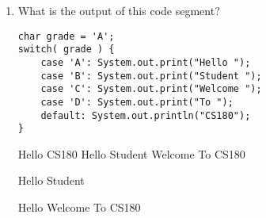 \documentclass[addpoints]{exam}
\begin{document}
\begin{enumerate}
\item {}
What is the output of this code segment?
\begin{lstlisting}
char grade = 'A';
switch( grade ) {
    case 'A': System.out.print("Hello ");
    case 'B': System.out.print("Student ");
    case 'C': System.out.print("Welcome ");
    case 'D': System.out.print("To ");
    default: System.out.println("CS180");
}

\end{lstlisting}
\begin{oneparchoices} 
\hspace{0.2cm}

 \choice Hello CS180 \vspace{1em}  
 \newline
 \choice \Ans Hello Student Welcome To CS180   \vspace{1em}
 \newline 

 \choice Hello Student   \vspace{1em}
 \newline 

 \choice Hello Welcome To CS180   \vspace{1em}
 \newline \newline

 \end{oneparchoices}
\end{enumerate}
\end{document}
